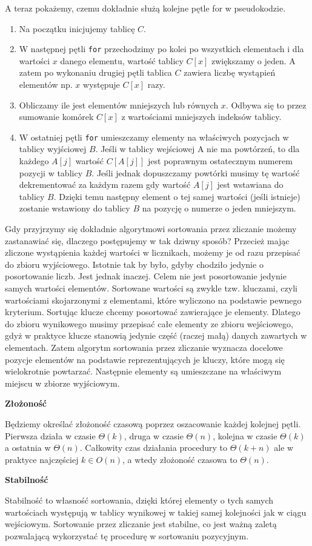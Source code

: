A teraz pokażemy, czemu dokładnie służą kolejne pętle for w pseudokodzie.

\begin{enumerate}
\item Na początku inicjujemy tablicę $C$.
\item W następnej pętli \texttt{for} przechodzimy po kolei po wszystkich elementach i dla wartości $x$ danego elementu, wartość tablicy $C[x]$ zwiększamy o jeden.
      A zatem po wykonaniu drugiej pętli tablica $C$ zawiera liczbę wystąpień elementów np. $x$ występuje $C[x]$ razy.
\item Obliczamy ile jest elementów mniejszych lub równych $x$. Odbywa się to przez sumowanie komórek $C[x]$ z wartościami mniejszych indeksów tablicy.
\item W ostatniej pętli \texttt{for} umieszczamy elementy na właściwych pozycjach w tablicy wyjściowej $B$.
      Jeśli w tablicy wejściowej A nie ma powtórzeń, to dla każdego $A[j]$ wartość $C[A[j]]$ jest poprawnym ostatecznym numerem pozycji w tablicy $B$.
      Jeśli jednak dopuszczamy powtórki musimy tę wartość dekrementować za każdym razem gdy wartość $A[j]$ jest wstawiana do tablicy $B$.
      Dzięki temu następny element o tej samej wartości (jeśli istnieje) zostanie wstawiony do tablicy $B$ na pozycję o numerze o jeden mniejszym.
\end{enumerate}

Gdy przyjrzymy się dokładnie algorytmowi sortowania przez zliczanie możemy zastanawiać się, dlaczego postępujemy w tak dziwny sposób?
Przecież mając zliczone wystąpienia każdej wartości w licznikach, możemy je od razu przepisać do zbioru wyjściowego.
Istotnie tak by było, gdyby chodziło jedynie o posortowanie liczb.
Jest jednak inaczej.
Celem nie jest posortowanie jedynie samych wartości elementów.
Sortowane wartości są zwykle tzw. kluczami, czyli wartościami skojarzonymi z elementami, które wyliczono na podstawie pewnego kryterium.
Sortując klucze chcemy posortować zawierające je elementy.
Dlatego do zbioru wynikowego musimy przepisać całe elementy ze zbioru wejściowego, gdyż w praktyce klucze stanowią jedynie część (raczej małą) danych zawartych w elementach.
Zatem algorytm sortowania przez zliczanie wyznacza docelowe pozycje elementów na podstawie reprezentujących je kluczy, które mogą się wielokrotnie powtarzać.
Następnie elementy są umieszczane na właściwym miejscu w zbiorze wyjściowym.

\textbf{Złożoność}

Będziemy określać złożoność czasową poprzez oszacowanie każdej kolejnej pętli.
Pierwsza działa w czasie $\Theta(k)$, druga w czasie $\Theta(n)$, kolejna w czasie $\Theta(k)$ a ostatnia w $\Theta(n)$.
Całkowity czas działania procedury to $\Theta(k+n)$ ale w praktyce najczęściej $k \in O(n)$, a wtedy złożoność czasowa to \textbf{$\Theta(n)$}.

\textbf{Stabilność}

Stabilność to własność sortowania, dzięki której elementy o tych samych wartościach występują w tablicy wynikowej w takiej samej kolejności jak w ciągu wejściowym.
Sortowanie przez zliczanie jest stabilne, co jest ważną zaletą pozwalającą wykorzystać tę procedurę w sortowaniu pozycyjnym.
